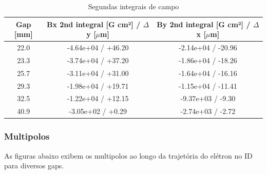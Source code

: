 \documentclass[a4paper,12pt]{article}
\begin{document}
\begin{table}[H]
\centering
\caption{Segundas integrais de campo}
\begin{tabular}{|c|c|c|}
\hline
   Gap [mm] & Bx 2nd integral [G cm²] / $\Delta$ y [$\mu$m] & By 2nd integral [G cm²] / $\Delta$ x [$\mu$m]   \\
\hline
    22.0 & -4.64e+04 / +46.20 & -2.14e+04 / -20.96 \\
    23.3 & -3.74e+04 / +37.20 & -1.86e+04 / -18.26 \\
    25.7 & -3.11e+04 / +31.00 & -1.64e+04 / -16.16 \\
    29.3 & -1.98e+04 / +19.71 & -1.15e+04 / -11.41 \\
    32.5 & -1.22e+04 / +12.15 & -9.37e+03 / -9.30 \\
    40.9 & -3.05e+02 / +0.29 & -2.74e+03 / -2.72 \\
\hline
\end{tabular}
\end{table}


\subsubsection{Multipolos}
As figuras abaixo exibem os multipolos ao longo da trajetória do elétron no ID para diversos gaps.
\end{document}
